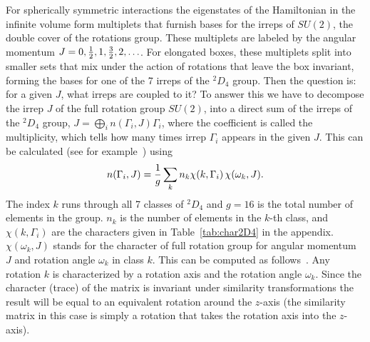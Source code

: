 \documentclass[aps,prd,reprint,showpacs,floatfix,longbibliography,,superscriptaddress]{revtex4-1}
\def\beq{\begin{equation}}
\def\eeq{\end{equation}}
\begin{document}
\begin{widetext}
For spherically symmetric interactions the eigenstates of the Hamiltonian in the
infinite volume form multiplets that furnish bases for the irreps of $SU(2)$, the double cover
of the rotations group. These multiplets are labeled by the angular momentum 
$J=0, {1\over 2}, 1, {3\over 2}, 2,\ldots$.
For elongated boxes, these multiplets split into smaller sets that mix under the action of rotations that leave the box invariant, forming the bases for one of the 7 irreps of the $^2D_{4}$ group. 
Then the question is: for a given $J$, what irreps are coupled to it? 
To answer this we have to decompose the irrep $J$ of the full rotation group $SU(2)$,   
into a direct sum of the irreps of the $^2D_{4}$ group,  $J=\bigoplus_i n(\Gamma_i, J) \Gamma_i$,  
where the coefficient is called the multiplicity, which tells how many times irrep $\Gamma_i$ appears in the given $J$.
This can be calculated (see for example~\cite{Johnson:1982, Moore:2005dw}) using 
\beq
n(\Gamma_i,J) = {1\over g} \sum_k n_k \chi(k,\Gamma_i) \,  \chi(\omega_k,J).
\label{eq:decom}
\eeq
The index $k$ runs through all  7 classes of $^2D_{4}$ and $g=16$ is the total number of elements in the group. 
$n_k$ is the number of elements in the $k$-th class, and $\chi(k,\Gamma_i)$ are the characters given in Table~\ref{tab:char2D4} in the appendix.
$\chi(\omega_k,J)$ stands for the character of full rotation group for angular momentum $J$ and rotation angle $\omega_k$ in class $k$.
This can be computed as follows~\cite{Tinkham:1992}.
Any rotation $k$ is characterized by a rotation axis and the rotation angle $\omega_k$. 
Since the character (trace) of the matrix is invariant under similarity transformations the result
will be equal to an equivalent rotation around the $z$-axis (the similarity matrix in this
case is simply a rotation that takes the rotation axis into the $z$-axis).

\end{widetext}
\end{document}
